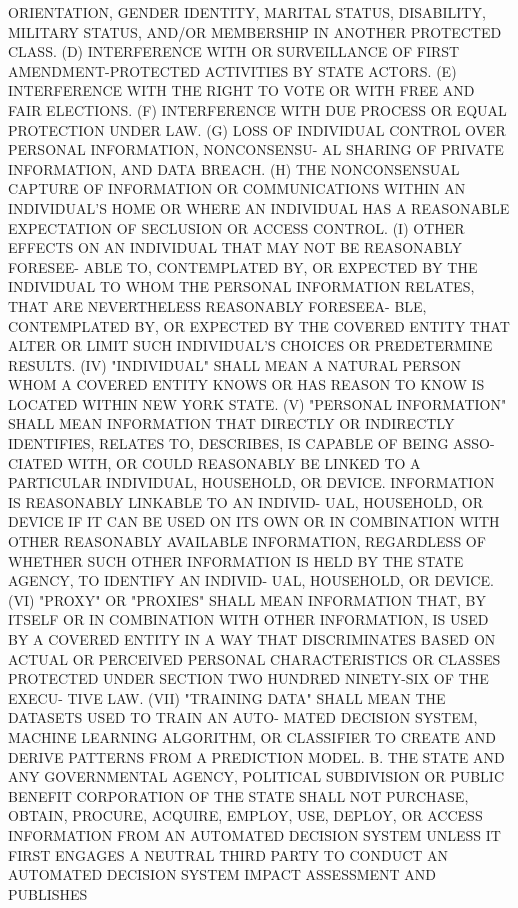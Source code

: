  ORIENTATION,  GENDER  IDENTITY,  MARITAL  STATUS,  DISABILITY,  MILITARY
 STATUS, AND/OR MEMBERSHIP IN ANOTHER PROTECTED CLASS.
   (D)  INTERFERENCE  WITH  OR  SURVEILLANCE OF FIRST AMENDMENT-PROTECTED
 ACTIVITIES BY STATE ACTORS.
   (E) INTERFERENCE WITH  THE  RIGHT  TO  VOTE  OR  WITH  FREE  AND  FAIR
 ELECTIONS.
   (F) INTERFERENCE WITH DUE PROCESS OR EQUAL PROTECTION UNDER LAW.
   (G) LOSS OF INDIVIDUAL CONTROL OVER PERSONAL INFORMATION, NONCONSENSU-
 AL SHARING OF PRIVATE INFORMATION, AND DATA BREACH.
   (H)  THE NONCONSENSUAL CAPTURE OF INFORMATION OR COMMUNICATIONS WITHIN
 AN INDIVIDUAL'S HOME OR WHERE AN INDIVIDUAL HAS A REASONABLE EXPECTATION
 OF SECLUSION OR ACCESS CONTROL.
   (I) OTHER EFFECTS ON AN INDIVIDUAL THAT MAY NOT BE REASONABLY FORESEE-
 ABLE TO, CONTEMPLATED BY, OR EXPECTED BY  THE  INDIVIDUAL  TO  WHOM  THE
 PERSONAL INFORMATION RELATES, THAT ARE NEVERTHELESS REASONABLY FORESEEA-
 BLE,  CONTEMPLATED  BY,  OR EXPECTED BY THE COVERED ENTITY THAT ALTER OR
 LIMIT SUCH INDIVIDUAL'S CHOICES OR PREDETERMINE RESULTS.
   (IV) "INDIVIDUAL" SHALL MEAN A NATURAL PERSON WHOM  A  COVERED  ENTITY
 KNOWS OR HAS REASON TO KNOW IS LOCATED WITHIN NEW YORK STATE.
   (V)  "PERSONAL  INFORMATION"  SHALL  MEAN INFORMATION THAT DIRECTLY OR
 INDIRECTLY IDENTIFIES, RELATES TO, DESCRIBES, IS CAPABLE OF BEING  ASSO-
 CIATED  WITH,  OR COULD REASONABLY BE LINKED TO A PARTICULAR INDIVIDUAL,
 HOUSEHOLD, OR DEVICE. INFORMATION IS REASONABLY LINKABLE TO AN  INDIVID-
 UAL, HOUSEHOLD, OR DEVICE IF IT CAN BE USED ON ITS OWN OR IN COMBINATION
 WITH  OTHER REASONABLY AVAILABLE INFORMATION, REGARDLESS OF WHETHER SUCH
 OTHER INFORMATION IS HELD BY THE STATE AGENCY, TO IDENTIFY  AN  INDIVID-
 UAL, HOUSEHOLD, OR DEVICE.
   (VI) "PROXY" OR "PROXIES" SHALL MEAN INFORMATION THAT, BY ITSELF OR IN
 COMBINATION WITH OTHER INFORMATION, IS USED BY A COVERED ENTITY IN A WAY
 THAT DISCRIMINATES BASED ON ACTUAL OR PERCEIVED PERSONAL CHARACTERISTICS
 OR  CLASSES PROTECTED UNDER SECTION TWO HUNDRED NINETY-SIX OF THE EXECU-
 TIVE LAW.
   (VII) "TRAINING DATA" SHALL MEAN THE DATASETS USED TO TRAIN  AN  AUTO-
 MATED  DECISION  SYSTEM,  MACHINE  LEARNING  ALGORITHM, OR CLASSIFIER TO
 CREATE AND DERIVE PATTERNS FROM A PREDICTION MODEL.
   B. THE STATE AND ANY GOVERNMENTAL  AGENCY,  POLITICAL  SUBDIVISION  OR
 PUBLIC  BENEFIT  CORPORATION  OF  THE  STATE SHALL NOT PURCHASE, OBTAIN,
 PROCURE, ACQUIRE, EMPLOY, USE, DEPLOY, OR  ACCESS  INFORMATION  FROM  AN
 AUTOMATED  DECISION SYSTEM UNLESS IT FIRST ENGAGES A NEUTRAL THIRD PARTY
 TO CONDUCT AN AUTOMATED DECISION SYSTEM IMPACT ASSESSMENT AND  PUBLISHES
